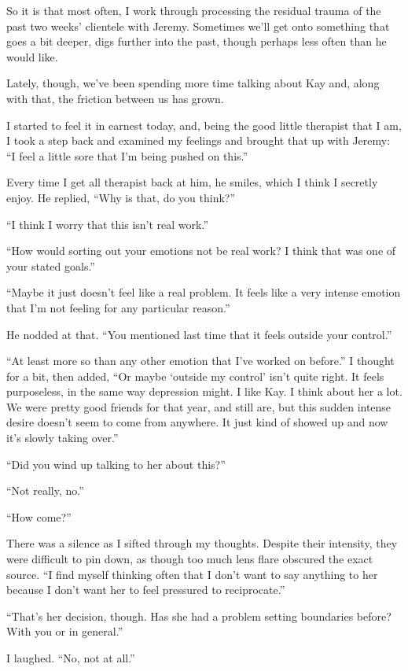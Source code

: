 So it is that most often, I work through processing the residual trauma of the past two weeks' clientele with Jeremy. Sometimes we'll get onto something that goes a bit deeper, digs further into the past, though perhaps less often than he would like.

Lately, though, we've been spending more time talking about Kay and, along with that, the friction between us has grown.

I started to feel it in earnest today, and, being the good little therapist that I am, I took a step back and examined my feelings and brought that up with Jeremy: ``I feel a little sore that I'm being pushed on this.''

Every time I get all therapist back at him, he smiles, which I think I secretly enjoy. He replied, ``Why is that, do you think?''

``I think I worry that this isn't real work.''

``How would sorting out your emotions not be real work? I think that was one of your stated goals.''

``Maybe it just doesn't feel like a real problem. It feels like a very intense emotion that I'm not feeling for any particular reason.''

He nodded at that. ``You mentioned last time that it feels outside your control.''

``At least more so than any other emotion that I've worked on before.'' I thought for a bit, then added, ``Or maybe `outside my control' isn't quite right. It feels purposeless, in the same way depression might. I like Kay. I think about her a lot. We were pretty good friends for that year, and still are, but this sudden intense desire doesn't seem to come from anywhere. It just kind of showed up and now it's slowly taking over.''

``Did you wind up talking to her about this?''

``Not really, no.''

``How come?''

There was a silence as I sifted through my thoughts. Despite their intensity, they were difficult to pin down, as though too much lens flare obscured the exact source. ``I find myself thinking often that I don't want to say anything to her because I don't want her to feel pressured to reciprocate.''

``That's her decision, though. Has she had a problem setting boundaries before? With you or in general.''

I laughed. ``No, not at all.''

